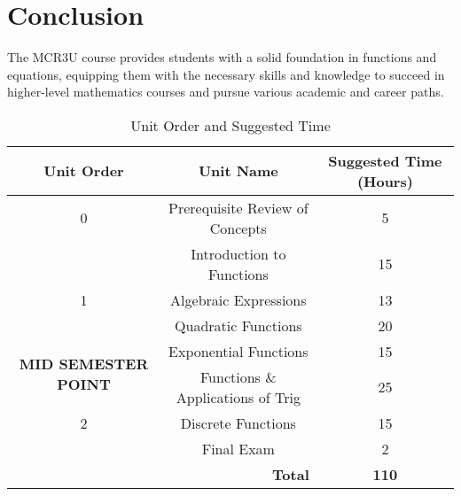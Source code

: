 \documentclass{article}
\begin{document}
\section{Conclusion}
The MCR3U course provides students with a solid foundation in functions and equations, equipping them with the necessary skills and knowledge to succeed in higher-level mathematics courses and pursue various academic and career paths.

\begin{table}[h]
\centering
\begin{tabular}{@{}ccc@{}}
\toprule
\textbf{Unit Order} & \textbf{Unit Name} & \textbf{Suggested Time (Hours)} \\ \midrule
0 & Prerequisite Review of Concepts & 5 \\
 & Introduction to Functions & 15 \\ \midrule
1 & Algebraic Expressions & 13 \\
 & Quadratic Functions & 20 \\ \midrule
\multirow{2}{*}{\textbf{MID SEMESTER POINT}} & Exponential Functions & 15 \\
 & Functions \& Applications of Trig & 25 \\ \midrule
2 & Discrete Functions & 15 \\
 & Final Exam & 2 \\ \midrule
\multicolumn{2}{r}{\textbf{Total}} & \textbf{110} \\ \bottomrule
\end{tabular}
\caption{Unit Order and Suggested Time}
\label{tab:unit_order}
\end{table}
\end{document}
